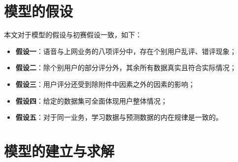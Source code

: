 \documentclass{MathorCupmodeling}
\begin{document}
	\section{模型的假设}
	本文对于模型的假设与初赛假设一致，如下：
	\begin{itemize}
		\item \textbf{假设一}：语音与上网业务的八项评分中，存在个别用户乱评、错评现象；
		\item \textbf{假设二}：除个别用户的部分评分外，其余所有数据真实且符合实际情况；
		\item \textbf{假设三}：用户评分还受到除附件中因素之外的因素的影响；
		\item \textbf{假设四}：给定的数据集可全面体现用户整体情况；
		\item \textbf{假设五}：对于同一业务，学习数据与预测数据的内在规律是一致的。
	\end{itemize}
	\section{模型的建立与求解}
	
	\newpage
	
\end{document}
